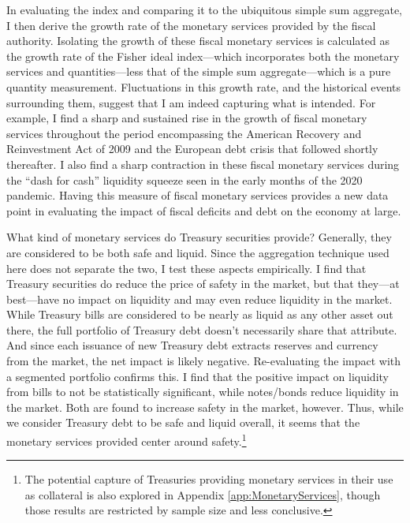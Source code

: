 \documentclass[11pt,a4paper,margin=1.5in]{article}
\begin{document}
In evaluating the index and comparing it to the ubiquitous simple sum aggregate, I then derive the growth rate of the monetary services provided by the fiscal authority. 
Isolating the growth of these fiscal monetary services is calculated as the growth rate of the Fisher ideal index---which incorporates both the monetary services and quantities---less that of the simple sum aggregate---which is a pure quantity measurement.
Fluctuations in this growth rate, and the historical events surrounding them, suggest that I am indeed capturing what is intended.
For example, I find a sharp and sustained rise in the growth of fiscal monetary services throughout the period encompassing the American Recovery and Reinvestment Act of 2009 and the European debt crisis that followed shortly thereafter.
I also find a sharp contraction in these fiscal monetary services during the ``dash for cash'' liquidity squeeze seen in the early months of the 2020 pandemic. 
Having this measure of fiscal monetary services provides a new data point in evaluating the impact of fiscal deficits and debt on the economy at large. 

What kind of monetary services do Treasury securities provide?
Generally, they are considered to be both safe and liquid.
Since the aggregation technique used here does not separate the two, I test these aspects empirically. 
I find that Treasury securities do reduce the price of safety in the market, but that they---at best---have no impact on liquidity and may even reduce liquidity in the market. 
While Treasury bills are considered to be nearly as liquid as any other asset out there, the full portfolio of Treasury debt doesn't necessarily share that attribute.
And since each issuance of new Treasury debt extracts reserves and currency from the market, the net impact is likely negative.
Re-evaluating the impact with a segmented portfolio confirms this. 
I find that the positive impact on liquidity from bills to not be statistically significant, while notes/bonds reduce liquidity in the market. 
Both are found to increase safety in the market, however. 
Thus, while we consider Treasury debt to be safe and liquid overall, it seems that the monetary services provided center around safety.\footnote{
	The potential capture of Treasuries providing monetary services in their use as collateral is also explored in Appendix \ref{app:MonetaryServices}, though those results are restricted by sample size and less conclusive.}
\end{document}
